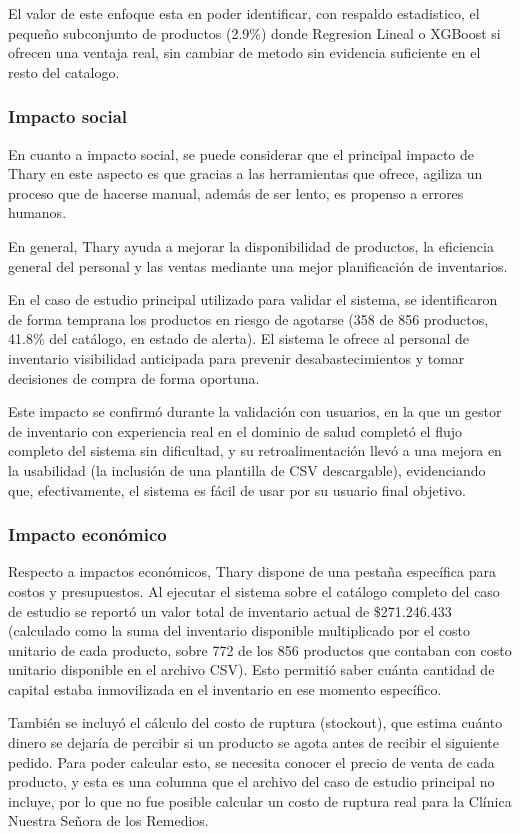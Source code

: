 El valor de este enfoque esta en poder identificar, con respaldo estadistico, el pequeño subconjunto de productos (2.9\%) donde Regresion Lineal o XGBoost si ofrecen una ventaja real, sin cambiar de metodo sin evidencia suficiente en el resto del catalogo.

\subsubsection{Impacto social}
En cuanto a impacto social, se puede considerar que el principal impacto de Thary en este aspecto es que gracias a las herramientas que ofrece, agiliza un proceso que de hacerse manual, además de ser lento, es propenso a errores humanos. 

En general, Thary ayuda a mejorar la disponibilidad de productos, la eficiencia general del personal y las ventas mediante una mejor planificación de inventarios. 

En el caso de estudio principal utilizado para validar el sistema, se identificaron de forma temprana los productos en riesgo de agotarse (358 de 856 productos, 41.8\% del catálogo, en estado de alerta). El sistema le ofrece al personal de inventario visibilidad anticipada para prevenir desabastecimientos y tomar decisiones de compra de forma oportuna.

Este impacto se confirmó durante la validación con usuarios, en la que un gestor de inventario con experiencia real en el dominio de salud completó el flujo completo del sistema sin dificultad, y su retroalimentación llevó a una mejora en la usabilidad (la inclusión de una plantilla de CSV descargable), evidenciando que, efectivamente, el sistema es fácil de usar por su usuario final objetivo.

\subsubsection{Impacto económico}
Respecto a impactos económicos, Thary dispone de una pestaña específica para costos y presupuestos. Al ejecutar el sistema sobre el catálogo completo del caso de estudio se reportó un valor total de inventario actual de \$271.246.433 (calculado como la suma del inventario disponible multiplicado por el costo unitario de cada producto, sobre 772 de los 856 productos que contaban con costo unitario disponible en el archivo CSV). Esto permitió saber cuánta cantidad de capital estaba inmovilizada en el inventario en ese momento específico.

También se incluyó el cálculo del costo de ruptura (stockout), que estima cuánto dinero se dejaría de percibir si un producto se agota antes de recibir el siguiente pedido. Para poder calcular esto, se necesita conocer el precio de venta de cada producto, y esta es una columna que el archivo del caso de estudio principal no incluye, por lo que no fue posible calcular un costo de ruptura real para la Clínica Nuestra Señora de los Remedios.

